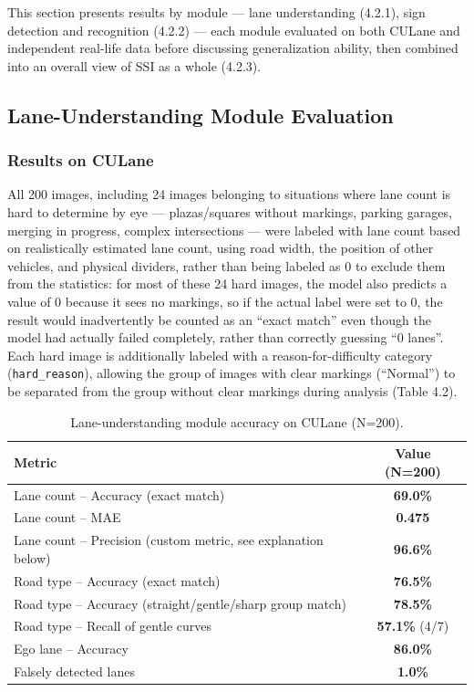 \documentclass[12pt,a4paper]{report}
\begin{document}
This section presents results by module --- lane understanding (4.2.1), sign detection and recognition (4.2.2) --- each module evaluated on both CULane and independent real-life data before discussing generalization ability, then combined into an overall view of SSI as a whole (4.2.3).

\subsection{Lane-Understanding Module Evaluation}

\subsubsection*{Results on CULane}

All 200 images, including 24 images belonging to situations where lane count is hard to determine by eye --- plazas/squares without markings, parking garages, merging in progress, complex intersections --- were labeled with lane count based on realistically estimated lane count, using road width, the position of other vehicles, and physical dividers, rather than being labeled as 0 to exclude them from the statistics: for most of these 24 hard images, the model also predicts a value of 0 because it sees no markings, so if the actual label were set to 0, the result would inadvertently be counted as an ``exact match'' even though the model had actually failed completely, rather than correctly guessing ``0 lanes''. Each hard image is additionally labeled with a reason-for-difficulty category (\texttt{hard\_reason}), allowing the group of images with clear markings (``Normal'') to be separated from the group without clear markings during analysis (Table 4.2).

\begin{table}[htbp]
    \centering
    \small
    \caption{Lane-understanding module accuracy on CULane (N=200).}
    \label{tab:4.1}
    \begin{tabular}{@{}p{7.5cm}c@{}}
        \toprule
        \textbf{Metric} & \textbf{Value (N=200)} \\
        \midrule
        Lane count -- Accuracy (exact match) & \textbf{69.0\%} \\
        Lane count -- MAE & \textbf{0.475} \\
        Lane count -- Precision (custom metric, see explanation below) & \textbf{96.6\%} \\
        Road type -- Accuracy (exact match) & \textbf{76.5\%} \\
        Road type -- Accuracy (straight/gentle/sharp group match) & \textbf{78.5\%} \\
        Road type -- Recall of gentle curves & \textbf{57.1\%} (4/7) \\
        Ego lane -- Accuracy & \textbf{86.0\%} \\
        Falsely detected lanes & \textbf{1.0\%} \\
        \bottomrule
    \end{tabular}
\end{table}
\end{document}
